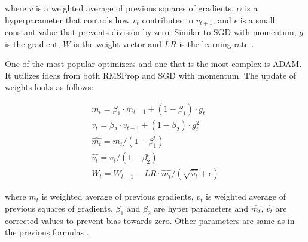 where $v$ is a weighted average of previous squares of gradients, $\alpha$ is a hyperparameter that controls how $v_t$ contributes to $v_{t+1}$, and $\epsilon$ is a small constant value that prevents division by zero. Similar to SGD with momentum, $g$ is the gradient, $W$ is the weight vector and $LR$ is the learning rate \cite{pytorchoptim}.

One of the most popular optimizers and one that is the most complex is ADAM. It utilizes ideas from both RMSProp and SGD with momentum. The update of weights looks as follows: 

\begin{equation}
\begin{split}
    m_t = \beta_1 \cdot m_{t-1} + (1 - \beta_1) \cdot g_t \\
    v_t = \beta_2 \cdot v_{t-1} + (1 - \beta_2) \cdot g_t^2 \\
    \hat{m_t} = m_t / (1 - \beta_1^t) \\
    \hat{v_t} = v_t / (1 - \beta_2^t) \\
    W_t = W_{t-1} - LR \cdot \hat{m_t} / (\sqrt{\hat{v_t}} + \epsilon) 
\end{split}
\end{equation}

where $m_t$ is weighted average of previous gradients, $v_t$ is weighted average of previous squares of gradients, $\beta_1$ and $\beta_2$ are hyper parameters and $\hat{m_t}$, $\hat{v_t}$ are corrected values to prevent bias towards zero. Other parameters are same as in the previous formulas \cite{pytorchoptim}.
